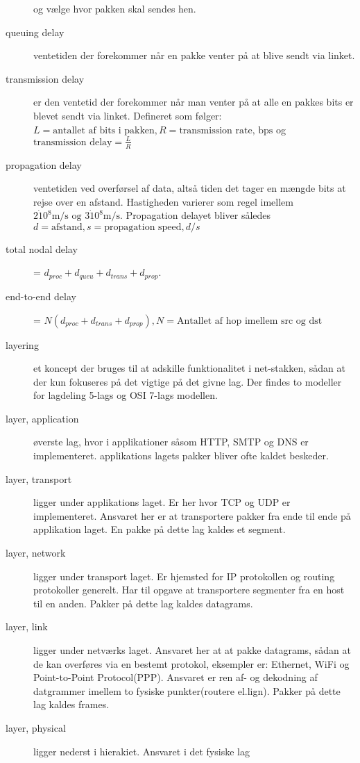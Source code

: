 \documentclass[10pt]{article}
\begin{document}
\begin{description}
    og vælge hvor pakken skal sendes hen.
\item[queuing delay] ventetiden der forekommer når en pakke venter på at blive
    sendt via linket.
\item[transmission delay] er den ventetid der forekommer når man venter på at
    alle en pakkes bits er blevet sendt via linket. Defineret som følger:
    $L = \text{antallet af bits i pakken}, R = \text{transmission rate,
    bps}$ og $\text{transmission delay} = \frac{L}{R}$
\item[propagation delay] ventetiden ved overførsel af data, altså tiden det
    tager en mængde bits at rejse over en afstand. Hastigheden varierer som
    regel imellem $2 \dot 10^8 \text{m/s og } 3 \dot 10^8 \text{m/s}$.
    Propagation delayet bliver således $d=\text{afstand}, s=\text{propagation
    speed}, d/s$
\item[total nodal delay] = $d_{proc} + d_{queu} + d_{trans} + d_{prop}$.
\item[end-to-end delay] = $N(d_{proc} + d_{trans} + d_{prop}), N =
    \text{Antallet af hop imellem src og dst}$
\item[layering] et koncept der bruges til at adskille funktionalitet i
    net-stakken, sådan at der kun fokuseres på det vigtige på det givne lag.
    Der findes to modeller for lagdeling 5-lags og OSI 7-lags modellen.
\item[layer, application] øverste lag, hvor i applikationer såsom HTTP, SMTP og
    DNS er implementeret. applikations lagets pakker bliver ofte kaldet
    beskeder.
\item[layer, transport] ligger under applikations laget. Er her hvor TCP og UDP
    er implementeret. Ansvaret her er at transportere pakker fra ende til ende
    på applikation laget. En pakke på dette lag kaldes et segment.
\item[layer, network] ligger under transport laget. Er hjemsted for IP
    protokollen og routing protokoller generelt. Har til opgave at transportere
    segmenter fra en host til en anden. Pakker på dette lag kaldes datagrams.
\item[layer, link] ligger under netværks laget. Ansvaret her at at pakke
    datagrams, sådan at de kan overføres via en bestemt protokol, eksempler er:
    Ethernet, WiFi og Point-to-Point Protocol(PPP).  Ansvaret er ren af- og
    dekodning af datgrammer imellem to fysiske punkter(routere el.lign). Pakker
    på dette lag kaldes frames.
\item[layer, physical] ligger nederst i hierakiet. Ansvaret i det fysiske lag

\end{description}
\end{document}

